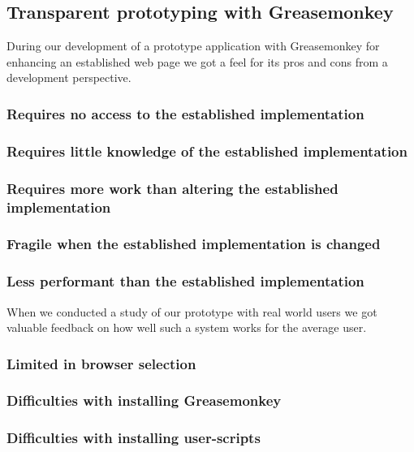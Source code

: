 \subsection{Transparent prototyping with Greasemonkey}

During our development of a prototype application with Greasemonkey for
enhancing an established web page we got a feel for its pros and cons from a
development perspective.

\subsubsection{Requires no access to the established implementation}

\subsubsection{Requires little knowledge of the established implementation}

\subsubsection{Requires more work than altering the established
  implementation}

\subsubsection{Fragile when the established implementation is changed}

\subsubsection{Less performant than the established implementation}

\parabreak

When we conducted a study of our prototype with real world users
we got valuable feedback on how well such a system works for the average user.

\subsubsection{Limited in browser selection}

\subsubsection{Difficulties with installing Greasemonkey}

\subsubsection{Difficulties with installing user-scripts}
